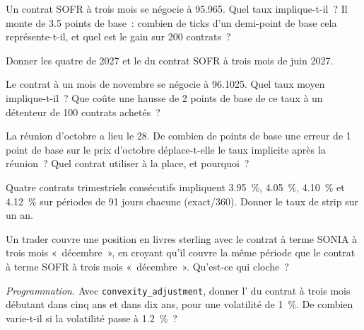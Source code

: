 \begin{exercise}[$\star$]\label{exo:m2:short-term-interest-rate-futures:1}
Un contrat SOFR à trois mois se négocie à 95.965. Quel taux implique-t-il~? Il monte de
3.5 points de base~: combien de ticks d'un demi-point de base cela représente-t-il, et quel est le gain sur 200
contrats~?
\end{exercise}

\begin{exercise}[$\star$]\label{exo:m2:short-term-interest-rate-futures:2}
Donner les quatre  de 2027 et le  du contrat
SOFR à trois mois de juin 2027.
\end{exercise}

\begin{exercise}[$\star$]\label{exo:m2:short-term-interest-rate-futures:3}
Le contrat à un mois de novembre se négocie à 96.1025. Quel taux moyen implique-t-il~?
Que coûte une hausse de 2 points de base de ce taux à un détenteur de 100
contrats achetés~?
\end{exercise}

\begin{exercise}[$\star\star$]\label{exo:m2:short-term-interest-rate-futures:4}
La réunion d'octobre a lieu le 28. De combien de points de base une erreur de
1 point de base sur le prix d'octobre déplace-t-elle le taux implicite après la réunion~?
Quel contrat utiliser à la place, et pourquoi~?
\end{exercise}

\begin{exercise}[$\star\star$]\label{exo:m2:short-term-interest-rate-futures:5}
Quatre contrats trimestriels consécutifs impliquent 3.95~\%, 4.05~\%, 4.10~\% et 4.12~\% sur
périodes de 91 jours chacune (exact/360). Donner le taux de strip sur un an.
\end{exercise}

\begin{exercise}[$\star\star$]\label{exo:m2:short-term-interest-rate-futures:6}
Un trader couvre une position en livres sterling avec le contrat à terme SONIA à trois mois
«~décembre~», en croyant qu'il couvre la même période que le contrat à terme SOFR à trois
mois «~décembre~». Qu'est-ce qui cloche~?
\end{exercise}

\begin{exercise}[$\star\star\star$]\label{exo:m2:short-term-interest-rate-futures:7}
\emph{Programmation.} Avec \texttt{convexity\_adjustment}, donner l' du
contrat à trois mois débutant dans cinq ans et dans dix ans, pour une volatilité de 1~\%.
De combien varie-t-il si la volatilité passe à 1.2~\%~?
\end{exercise}

